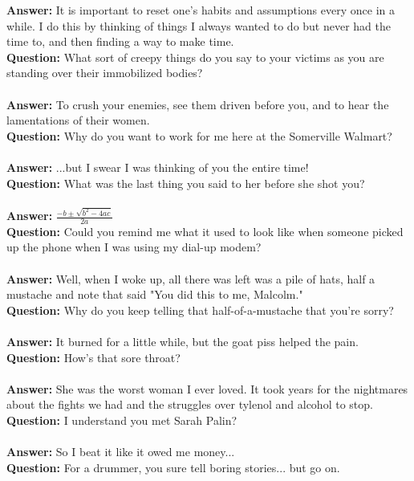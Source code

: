 \documentclass[a4paper]{article}
\begin{document}
\textbf{Answer:} It is important to reset one's habits and assumptions every once in a while. I do this by thinking of things I always wanted to do but never had the time to, and then finding a way to make time. \\
\textbf{Question:} What sort of creepy things do you say to your victims as you are standing over their immobilized bodies? \\ \\
\textbf{Answer:} To crush your enemies, see them driven before you, and to hear the lamentations of their women. \\
\textbf{Question:} Why do you want to work for me here at the Somerville Walmart? \\ \\
\textbf{Answer:} ...but I swear I was thinking of you the entire time! \\
\textbf{Question:} What was the last thing you said to her before she shot you? \\ \\
\textbf{Answer:} $\frac{-b \pm \sqrt{b^2 - 4ac}}{2a}$ \\
\textbf{Question:} Could you remind me what it used to look like when someone picked up the phone when I was using my dial-up modem? \\ \\
\textbf{Answer:} Well, when I woke up, all there was left was a pile of hats, half a mustache and note that said "You did this to me, Malcolm." \\
\textbf{Question:} Why do you keep telling that half-of-a-mustache that you're sorry? \\ \\
\textbf{Answer:} It burned for a little while, but the goat piss helped the pain. \\
\textbf{Question:} How's that sore throat? \\ \\
\textbf{Answer:} She was the worst woman I ever loved. It took years for the nightmares about the fights we had and the struggles over tylenol and alcohol to stop. \\
\textbf{Question:} I understand you met Sarah Palin? \\ \\
\textbf{Answer:} So I beat it like it owed me money... \\
\textbf{Question:} For a drummer, you sure tell boring stories... but go on. \\ \\
\end{document}
